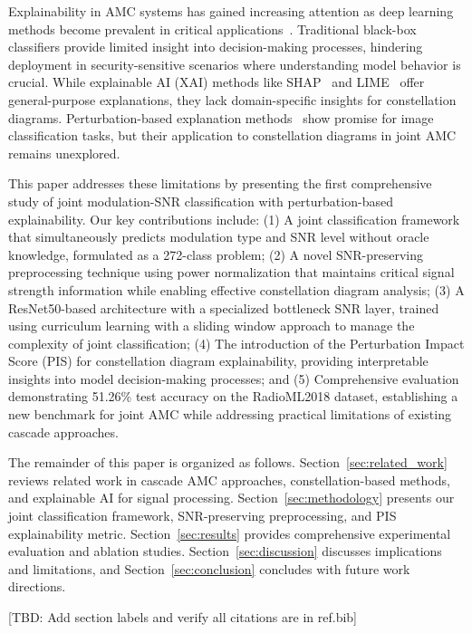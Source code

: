 \documentclass{ELSP}
\begin{document}
Explainability in AMC systems has gained increasing attention as deep learning methods become prevalent in critical applications~\cite{arrieta2020explainable,samek2019explainable}. Traditional black-box classifiers provide limited insight into decision-making processes, hindering deployment in security-sensitive scenarios where understanding model behavior is crucial. While explainable AI (XAI) methods like SHAP~\cite{lundberg2017shap} and LIME~\cite{ribeiro2016lime} offer general-purpose explanations, they lack domain-specific insights for constellation diagrams. Perturbation-based explanation methods~\cite{fong2017interpretable,petsiuk2018rise} show promise for image classification tasks, but their application to constellation diagrams in joint AMC remains unexplored.

This paper addresses these limitations by presenting the first comprehensive study of joint modulation-SNR classification with perturbation-based explainability. Our key contributions include: (1) A joint classification framework that simultaneously predicts modulation type and SNR level without oracle knowledge, formulated as a 272-class problem; (2) A novel SNR-preserving preprocessing technique using power normalization that maintains critical signal strength information while enabling effective constellation diagram analysis; (3) A ResNet50-based architecture with a specialized bottleneck SNR layer, trained using curriculum learning with a sliding window approach to manage the complexity of joint classification; (4) The introduction of the Perturbation Impact Score (PIS) for constellation diagram explainability, providing interpretable insights into model decision-making processes; and (5) Comprehensive evaluation demonstrating 51.26\% test accuracy on the RadioML2018 dataset, establishing a new benchmark for joint AMC while addressing practical limitations of existing cascade approaches.

The remainder of this paper is organized as follows. Section~\ref{sec:related_work} reviews related work in cascade AMC approaches, constellation-based methods, and explainable AI for signal processing. Section~\ref{sec:methodology} presents our joint classification framework, SNR-preserving preprocessing, and PIS explainability metric. Section~\ref{sec:results} provides comprehensive experimental evaluation and ablation studies. Section~\ref{sec:discussion} discusses implications and limitations, and Section~\ref{sec:conclusion} concludes with future work directions.

[TBD: Add section labels and verify all citations are in ref.bib]
\end{document}

